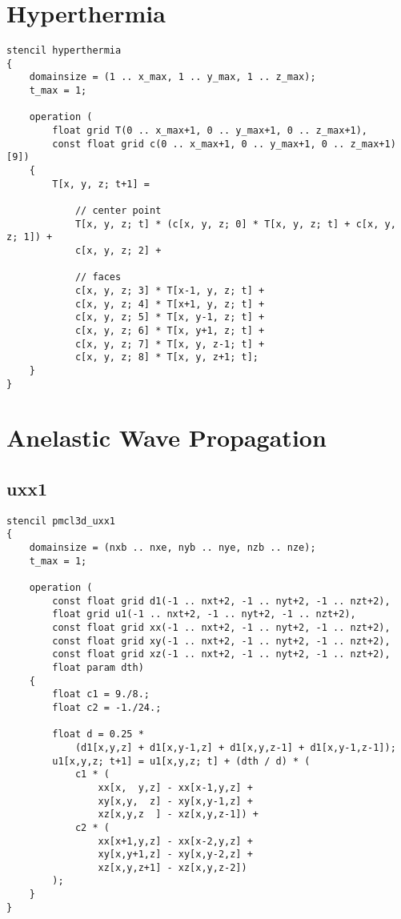 \begin{comment}
			w1_a * w2_b * w4_c * u[x-1, y, z+2; t] +
			w2_a * w2_b * w4_c * u[x,   y, z+2; t] +
			w3_a * w2_b * w4_c * u[x+1, y, z+2; t] +
			w4_a * w2_b * w4_c * u[x+2, y, z+2; t] +

			w1_a * w3_b * w4_c * u[x-1, y+1, z+2; t] +
			w2_a * w3_b * w4_c * u[x,   y+1, z+2; t] +
			w3_a * w3_b * w4_c * u[x+1, y+1, z+2; t] +
			w4_a * w3_b * w4_c * u[x+2, y+1, z+2; t] +

			w1_a * w4_b * w4_c * u[x-1, y+2, z+2; t] +
			w2_a * w4_b * w4_c * u[x,   y+2, z+2; t] +
			w3_a * w4_b * w4_c * u[x+1, y+2, z+2; t] +
			w4_a * w4_b * w4_c * u[x+2, y+2, z+2; t];
\end{comment}

\section{Hyperthermia}
\begin{lstlisting}[language=stencil]
stencil hyperthermia
{
	domainsize = (1 .. x_max, 1 .. y_max, 1 .. z_max);
	t_max = 1;

	operation (
		float grid T(0 .. x_max+1, 0 .. y_max+1, 0 .. z_max+1),
		const float grid c(0 .. x_max+1, 0 .. y_max+1, 0 .. z_max+1)[9])
	{
		T[x, y, z; t+1] =
		
			// center point
			T[x, y, z; t] * (c[x, y, z; 0] * T[x, y, z; t] + c[x, y, z; 1]) +
			c[x, y, z; 2] +
			
			// faces
			c[x, y, z; 3] * T[x-1, y, z; t] +
			c[x, y, z; 4] * T[x+1, y, z; t] +
			c[x, y, z; 5] * T[x, y-1, z; t] +
			c[x, y, z; 6] * T[x, y+1, z; t] +
			c[x, y, z; 7] * T[x, y, z-1; t] +
			c[x, y, z; 8] * T[x, y, z+1; t];
	}
}
\end{lstlisting}


\section{Anelastic Wave Propagation}

\subsection{uxx1}
\begin{lstlisting}[language=stencil]
stencil pmcl3d_uxx1
{
	domainsize = (nxb .. nxe, nyb .. nye, nzb .. nze);
	t_max = 1;
	
	operation (
		const float grid d1(-1 .. nxt+2, -1 .. nyt+2, -1 .. nzt+2),
		float grid u1(-1 .. nxt+2, -1 .. nyt+2, -1 .. nzt+2),
		const float grid xx(-1 .. nxt+2, -1 .. nyt+2, -1 .. nzt+2), 
		const float grid xy(-1 .. nxt+2, -1 .. nyt+2, -1 .. nzt+2),
		const float grid xz(-1 .. nxt+2, -1 .. nyt+2, -1 .. nzt+2),
		float param dth)
	{
		float c1 = 9./8.;
		float c2 = -1./24.;
      
		float d = 0.25 *
			(d1[x,y,z] + d1[x,y-1,z] + d1[x,y,z-1] + d1[x,y-1,z-1]);
		u1[x,y,z; t+1] = u1[x,y,z; t] + (dth / d) * (
			c1 * (
				xx[x,  y,z] - xx[x-1,y,z] +
				xy[x,y,  z] - xy[x,y-1,z] +
				xz[x,y,z  ] - xz[x,y,z-1]) +
			c2 * (
				xx[x+1,y,z] - xx[x-2,y,z] +
				xy[x,y+1,z] - xy[x,y-2,z] +
				xz[x,y,z+1] - xz[x,y,z-2])
		);
	}
}
\end{lstlisting}

